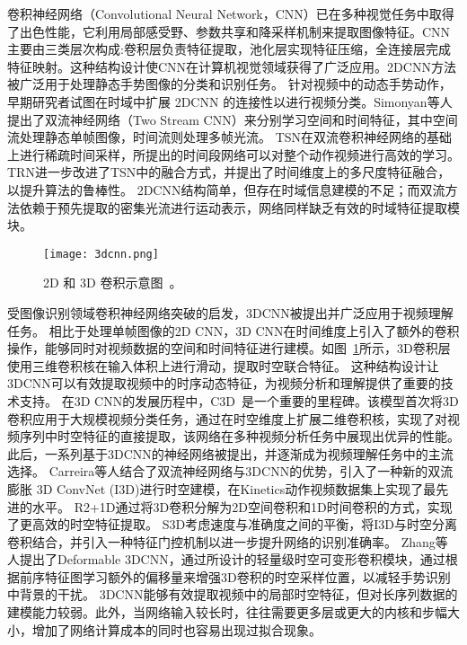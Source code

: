 卷积神经网络（Convolutional Neural Network，CNN）已在多种视觉任务中取得了出色性能，它利用局部感受野、参数共享和降采样机制来提取图像特征。CNN主要由三类层次构成:卷积层负责特征提取，池化层实现特征压缩，全连接层完成特征映射。这种结构设计使CNN在计算机视觉领域获得了广泛应用。2DCNN方法被广泛用于处理静态手势图像的分类和识别任务。%
针对视频中的动态手势动作，早期研究者试图在时域中扩展 2DCNN 的连接性以进行视频分类\cite{karpathy2014large}。Simonyan等人\cite{simonyan2014twostream}提出了双流神经网络（Two Stream CNN）来分别学习空间和时间特征，其中空间流处理静态单帧图像，时间流则处理多帧光流。
TSN\cite{wang2016tsn}在双流卷积神经网络的基础上进行稀疏时间采样，所提出的时间段网络可以对整个动作视频进行高效的学习。
TRN\cite{zhou2018trn}进一步改进了TSN中的融合方式，并提出了时间维度上的多尺度特征融合，以提升算法的鲁棒性。
2DCNN结构简单，但存在时域信息建模的不足；而双流方法依赖于预先提取的密集光流进行运动表示，网络同样缺乏有效的时域特征提取模块。

\begin{figure}[htbp]
  \centering
  \texttt{[image: 3dcnn.png]}
  \caption{2D 和 3D 卷积示意图~\cite{tran2015c3d}。}%
  \label{fig:3dcnn}
\end{figure}

受图像识别领域卷积神经网络突破的启发，3DCNN被提出并广泛应用于视频理解任务。
相比于处理单帧图像的2D CNN，3D CNN在时间维度上引入了额外的卷积操作，能够同时对视频数据的空间和时间特征进行建模。如图~\ref{fig:3dcnn}所示，3D卷积层使用三维卷积核在输入体积上进行滑动，提取时空联合特征。
这种结构设计让3DCNN可以有效提取视频中的时序动态特征，为视频分析和理解提供了重要的技术支持。
在3D CNN的发展历程中，C3D~\cite{tran2015c3d}是一个重要的里程碑。该模型首次将3D卷积应用于大规模视频分类任务，通过在时空维度上扩展二维卷积核，实现了对视频序列中时空特征的直接提取，该网络在多种视频分析任务中展现出优异的性能。
此后，一系列基于3DCNN的神经网络被提出，并逐渐成为视频理解任务中的主流选择。
Carreira等人\cite{carreira2017i3d}结合了双流神经网络与3DCNN的优势，引入了一种新的双流膨胀 3D ConvNet (I3D)进行时空建模，在Kinetics动作视频数据集上实现了最先进的水平。
R2+1D\cite{tran2018r2+1d}通过将3D卷积分解为2D空间卷积和1D时间卷积的方式，实现了更高效的时空特征提取。
S3D\cite{xie2018s3d}考虑速度与准确度之间的平衡，将I3D与时空分离卷积结合，并引入一种特征门控机制以进一步提升网络的识别准确率。
Zhang等人提出了Deformable 3DCNN\cite{zhang2020deformable3d}，通过所设计的轻量级时空可变形卷积模块，通过根据前序特征图学习额外的偏移量来增强3D卷积的时空采样位置，以减轻手势识别中背景的干扰。
3DCNN能够有效提取视频中的局部时空特征，但对长序列数据的建模能力较弱。此外，当网络输入较长时，往往需要更多层或更大的内核和步幅大小，增加了网络计算成本的同时也容易出现过拟合现象。


